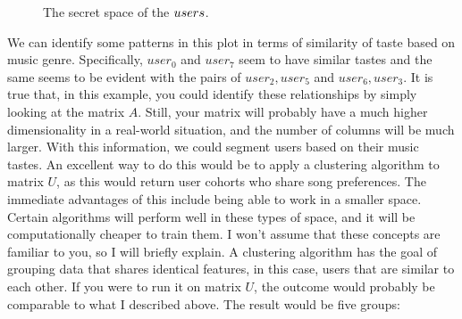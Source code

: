 \documentclass[600paper, 11pt,twoside,openany]{kdp}
\begin{document}
\begin{figure}[h!]
\begin{center}
\end{center}
\caption{The secret space of the $\protect users$.}
\end{figure}

We can identify some patterns in this plot in terms of similarity of taste based on music genre. Specifically,  $user_0$ and $user_7$ seem to have similar tastes and the same seems to be evident with the pairs of $user_2,user_5$ and $user_6,user_3$. It is true that, in this example, you could identify these relationships by simply looking at the matrix $A$. Still, your matrix will probably have a much higher dimensionality in a real-world situation, and the number of columns will be much larger. With this information, we could segment users based on their music tastes. An excellent way to do this would be to apply a clustering algorithm to matrix $U$, as this would return user cohorts who share song preferences. The immediate advantages of this include being able to work in a smaller space. Certain algorithms will perform well in these types of space, and it will be computationally cheaper to train them. I won’t assume that these concepts are familiar to you, so I will briefly explain. A clustering algorithm has the goal of grouping data that shares identical features, in this case, users that are similar to each other. If you were to run it on matrix $U$, the outcome would probably be comparable to what I described above. The result would be five groups:
\end{document}
